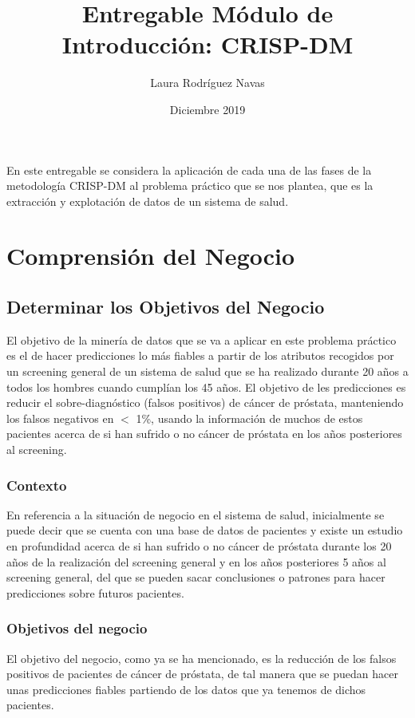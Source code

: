 \documentclass{article}
\title{Entregable Módulo de Introducción: CRISP-DM}
\author{Laura Rodríguez Navas}
\date{Diciembre 2019}
\begin{document}
\maketitle

En este entregable se considera la aplicación de cada una de las fases de la metodología CRISP-DM al problema práctico que se nos plantea, que es la extracción y explotación de datos de un sistema de salud.

\section{Comprensión del Negocio}

\subsection{Determinar los Objetivos del Negocio}
El objetivo de la minería de datos que se va a aplicar en este problema práctico es el de hacer predicciones lo más fiables a partir de los atributos recogidos por un screening general de un sistema de salud que se ha realizado durante 20 años a todos los hombres cuando cumplían los 45 años. El objetivo de les predicciones es reducir el sobre-diagnóstico (falsos positivos) de cáncer de próstata, manteniendo los falsos negativos en $<$ 1\%, usando la información de muchos de estos pacientes acerca de si han sufrido o no cáncer de próstata en los años posteriores al screening.

\subsubsection{Contexto}
En referencia a la situación de negocio en el sistema de salud, inicialmente se puede decir que se cuenta con una base de datos de pacientes y existe un estudio en profundidad acerca de si han sufrido o no cáncer de próstata durante los 20 años de la realización del screening general y en los años posteriores 5 años al screening general, del que se pueden sacar conclusiones o patrones para hacer predicciones sobre futuros pacientes.

\subsubsection{Objetivos del negocio}
El objetivo del negocio, como ya se ha mencionado, es la reducción de los falsos positivos de pacientes de cáncer de próstata, de tal manera que se puedan hacer unas predicciones fiables partiendo de los datos que ya tenemos de dichos pacientes. 
\end{document}

